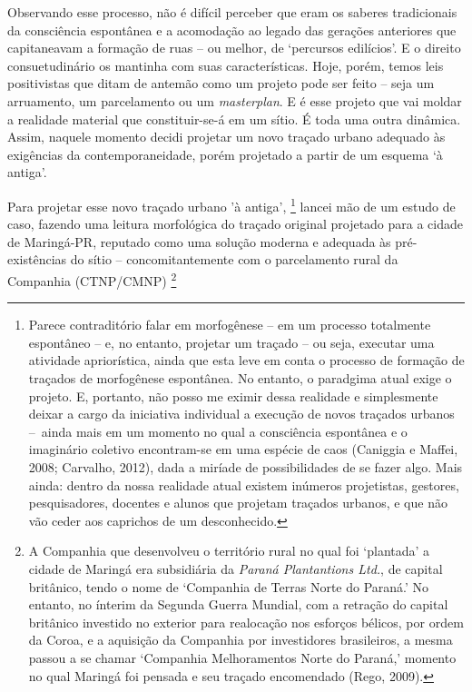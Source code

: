 \documentclass[]{report}
\begin{document}
	Observando esse processo, não é difícil perceber que eram os saberes tradicionais da consciência espontânea e a acomodação ao legado das gerações anteriores que capitaneavam a formação de ruas – ou melhor, de `percursos edilícios'. E o direito consuetudinário os mantinha com suas características. Hoje, porém, temos leis positivistas que ditam de antemão como um projeto pode ser feito – seja um arruamento, um parcelamento ou um \textit{masterplan}. E é esse projeto que vai moldar a realidade material que constituir-se-á em um sítio. É toda uma outra dinâmica. Assim, naquele momento decidi projetar um novo traçado urbano adequado às exigências da contemporaneidade, porém projetado a partir de um esquema `à antiga'.

	Para projetar esse novo traçado urbano 'à antiga',
		\footnote[2]{Parece contraditório falar em morfogênese – em um processo totalmente espontâneo – e, no entanto, projetar um traçado – ou seja, executar uma atividade apriorística, ainda que esta leve em conta o processo de formação de traçados de morfogênese espontânea. No entanto, o paradgima atual exige o projeto. E, portanto, não posso me eximir dessa realidade e simplesmente deixar a cargo da iniciativa individual a execução de novos traçados urbanos – ainda mais em um momento no qual a consciência espontânea e o imaginário coletivo encontram-se em uma espécie de caos (Caniggia e Maffei, 2008; Carvalho, 2012), dada a miríade de possibilidades de se fazer algo. Mais ainda: dentro da nossa realidade atual existem inúmeros projetistas, gestores, pesquisadores, docentes e alunos que projetam traçados urbanos, e que não vão ceder aos caprichos de um desconhecido.} 
	lancei mão de um estudo de caso, fazendo uma leitura morfológica do traçado original projetado para a cidade de Maringá-PR, reputado como uma solução moderna e adequada às pré-existências do sítio – concomitantemente com o parcelamento rural da Companhia (CTNP/CMNP) 
		\footnote[2]{A Companhia que desenvolveu o território rural no qual foi `plantada' a cidade de Maringá era subsidiária da \textit{Paraná Plantantions Ltd.}, de capital britânico, tendo o nome de `Companhia de Terras Norte do Paraná.' No entanto, no ínterim da Segunda Guerra Mundial, com a retração do capital britânico investido no exterior para realocação nos esforços bélicos, por ordem da Coroa, e a aquisição da Companhia por investidores brasileiros, a mesma passou a se chamar `Companhia Melhoramentos Norte do Paraná,' momento no qual Maringá foi pensada e seu traçado encomendado (Rego, 2009).} 
\end{document}
